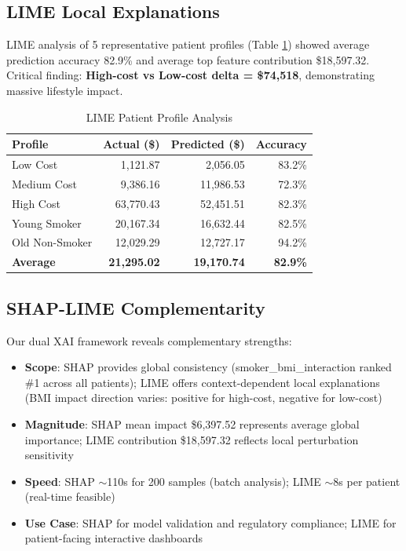 \documentclass[conference]{IEEEtran}
\begin{document}
\subsection{LIME Local Explanations}
LIME analysis of 5 representative patient profiles (Table \ref{tab:lime}) showed average prediction accuracy 82.9\% and average top feature contribution \$18,597.32. Critical finding: \textbf{High-cost vs Low-cost delta = \$74,518}, demonstrating massive lifestyle impact.

\begin{table}[htbp]
\caption{LIME Patient Profile Analysis}
\begin{center}
\begin{tabular}{|l|r|r|r|}
\hline
\textbf{Profile} & \textbf{Actual (\$)} & \textbf{Predicted (\$)} & \textbf{Accuracy} \\
\hline
Low Cost & 1,121.87 & 2,056.05 & 83.2\% \\
Medium Cost & 9,386.16 & 11,986.53 & 72.3\% \\
High Cost & 63,770.43 & 52,451.51 & 82.3\% \\
Young Smoker & 20,167.34 & 16,632.44 & 82.5\% \\
Old Non-Smoker & 12,029.29 & 12,727.17 & 94.2\% \\
\hline
\textbf{Average} & \textbf{21,295.02} & \textbf{19,170.74} & \textbf{82.9\%} \\
\hline
\end{tabular}
\label{tab:lime}
\end{center}
\end{table}

\subsection{SHAP-LIME Complementarity}
Our dual XAI framework reveals complementary strengths:
\begin{itemize}
\item \textbf{Scope}: SHAP provides global consistency (smoker\_bmi\_interaction ranked \#1 across all patients); LIME offers context-dependent local explanations (BMI impact direction varies: positive for high-cost, negative for low-cost)
\item \textbf{Magnitude}: SHAP mean impact \$6,397.52 represents average global importance; LIME contribution \$18,597.32 reflects local perturbation sensitivity
\item \textbf{Speed}: SHAP $\sim$110s for 200 samples (batch analysis); LIME $\sim$8s per patient (real-time feasible)
\item \textbf{Use Case}: SHAP for model validation and regulatory compliance; LIME for patient-facing interactive dashboards
\end{itemize}
\end{document}
